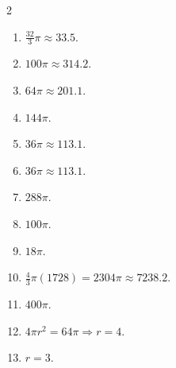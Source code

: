 \documentclass[11pt]{article}
\begin{document}
\begin{keybox}
\begin{multicols}{2}
\small
\begin{enumerate}[leftmargin=*,itemsep=3pt]
  \item $\tfrac{32}{3}\pi\approx33.5$.
  \item $100\pi\approx314.2$.
  \item $64\pi\approx201.1$.
  \item $144\pi$.
  \item $36\pi\approx113.1$.
  \item $36\pi\approx113.1$.
  \item $288\pi$.
  \item $100\pi$.
  \item $18\pi$.
  \item $\tfrac43\pi(1728)=2304\pi\approx7238.2$.
  \item $400\pi$.
  \item $4\pi r^2=64\pi\Rightarrow r=4$.
  \item $r=3$.
\end{enumerate}
\end{multicols}
\end{keybox}
\end{document}
